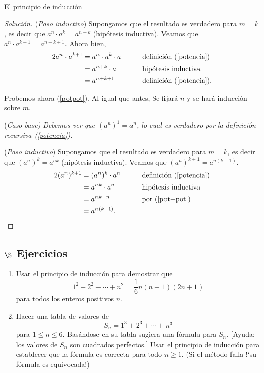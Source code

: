 \begin{section}{El principio de inducción}
\begin{ejemplo}
\begin{proof}[Solución]
\noindent ({\it Paso  inductivo}) Supongamos que el resultado es verdadero para $m=k$, es decir que $a^{n} \cdot a^k = a^{n+k}$ (hipótesis inductiva). Veamos que  $a^{n} \cdot a^{k+1} = a^{n+k+1}$. Ahora bien, 
\begin{alignat*}2
a^{n} \cdot a^{k+1} &= a^{n} \cdot a^{k} \cdot a &\qquad  &\text{definición (\ref{potencia})} \\
&= a^{n+k} \cdot a &\qquad &\text{hipótesis inductiva} \\
&= a^{n+k+1} &\qquad  &\text{definición (\ref{potencia})}. 
\end{alignat*}

Probemos ahora (\ref{potpot}). Al igual que antes, Se fijará $n$ y se hará inducción sobre $m$.

\noindent(\it Caso  base\rm) Debemos ver que $(a^n)^1 = a^n$, lo cual es verdadero por la definición recursiva (\ref{potencia}). 


\noindent ({\it Paso  inductivo}) Supongamos que el resultado es verdadero para $m=k$, es decir que  $(a^n)^k = a^{nk}$ (hipótesis inductiva). Veamos que  $(a^n)^{k+1} = a^{n(k+1)}$. 
\begin{alignat*}2
(a^n)^{k+1} &= (a^n)^{k} \cdot a^n &\qquad  &\text{definición (\ref{potencia})} \\
&= a^{nk} \cdot a^n &\qquad &\text{hipótesis inductiva} \\
&= a^{nk+n} &\qquad  &\text{por (\ref{pot+pot}})\\
&= a^{n(k+1)}. &\qquad  &
\end{alignat*}

\end{proof}
\end{ejemplo}



\subsection*{\Large $\S$ Ejercicios}
\begin{enumerate}
\item Usar el principio de inducción para demostrar que
$$
1^2+2^2+\cdots +n^2 = \frac16 n(n+1)(2n +1)
$$
para todos los enteros positivos $n$.

\item Hacer una tabla de valores de
$$
S_n = 1^3+2^3+\cdots +n^3
$$
para $1 \le n\le 6$. Basándose en su tabla sugiera una fórmula
para $S_n$. [Ayuda: los valores de $S_n$ son cuadrados perfectos.]
Usar el principio de inducción para establecer que la fórmula es
correcta para todo $n\ge 1$. (Si el método falla !`su fórmula es
equivocada!)


\end{enumerate}
\end{section}
